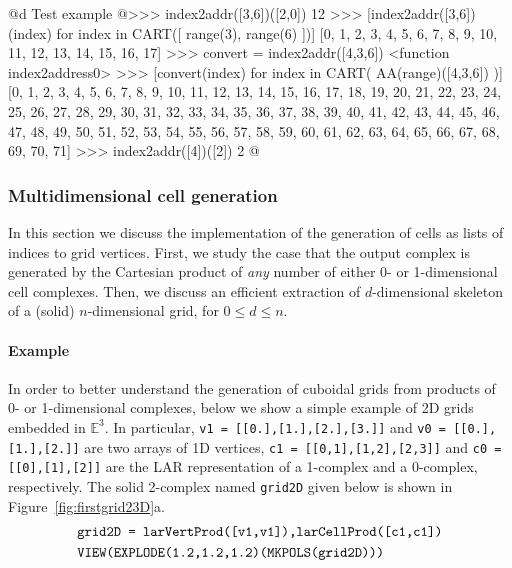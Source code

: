 \documentclass[11pt,oneside]{article}	%
\def\E{\mathbb{E}}
\begin{document}
@d Test example 
@{>>> index2addr([3,6])([2,0])
12
>>> [index2addr([3,6])(index) for index in CART([ range(3), range(6) ])]
[0, 1, 2, 3, 4, 5, 6, 7, 8, 9, 10, 11, 12, 13, 14, 15, 16, 17]
>>> convert = index2addr([4,3,6])
<function index2address0>
>>> [convert(index) for index in CART( AA(range)([4,3,6]) )]
[0, 1, 2, 3, 4, 5, 6, 7, 8, 9, 10, 11, 12, 13, 14, 15, 16, 17, 18, 19, 20, 
21, 22, 23, 24, 25, 26, 27, 28, 29, 30, 31, 32, 33, 34, 35, 36, 37, 38, 39, 
40, 41, 42, 43, 44, 45, 46, 47, 48, 49, 50, 51, 52, 53, 54, 55, 56, 57, 58, 
59, 60, 61, 62, 63, 64, 65, 66, 67, 68, 69, 70, 71]
>>> index2addr([4])([2])
2
@}

\subsubsection{Multidimensional cell generation}

In this section we discuss the implementation of the generation of cells as lists of indices to grid vertices. First, we study the case that the output complex is generated by the Cartesian product of \emph{any} number of either 0- or 1-dimensional cell complexes. Then, we discuss an efficient extraction of $d$-dimensional skeleton of a (solid) $n$-dimensional grid, for $0\leq d\leq n$.


\paragraph{Example}
In order to better understand the generation of cuboidal grids from products of 0- or 1-dimensional complexes, below we show a simple example of 2D grids embedded in $\E^3$.
In particular, \texttt{v1 = [[0.],[1.],[2.],[3.]]} and \texttt{v0 = [[0.],[1.],[2.]]} are two arrays of 1D vertices, \texttt{c1 = [[0,1],[1,2],[2,3]]} and \texttt{c0 = [[0],[1],[2]]} are the LAR representation of a 1-complex and a 0-complex, respectively. The solid 2-complex named \texttt{grid2D} given below is shown in Figure~\ref{fig:firstgrid23D}a.
\begin{align*}\scriptsize
&\texttt{grid2D = larVertProd([v1,v1]),larCellProd([c1,c1])}\\
&\texttt{VIEW(EXPLODE(1.2,1.2,1.2)(MKPOLS(grid2D)))}
\end{align*}
\end{document}
